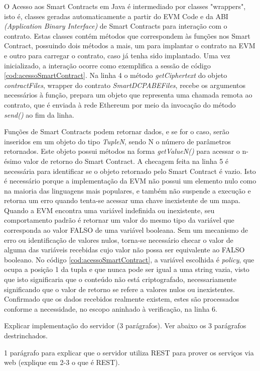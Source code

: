 \documentclass[a4paper,11pt]{article}
\begin{document}
O Acesso aos Smart Contracts em Java é intermediado por classes "wrappers", isto é, classes geradas automaticamente a partir do EVM Code e da ABI \emph{(Application Binary Interface)} de Smart Contracts para interação com o contrato.
Estas classes contém métodos que correspondem às funções nos Smart Contract, possuindo dois métodos a mais, um para implantar o contrato na EVM e outro para carregar o contrato, caso já tenha sido implantado.
Uma vez inicializado, a interação ocorre como exemplifica a sessão de código \ref{cod:acessoSmartContract}.
Na linha 4 o método \emph{getCiphertext} do objeto \emph{contractFiles}, wrapper do contrato \emph{SmartDCPABEFiles}, recebe os argumentos necessários à função, prepara um objeto que representa uma chamada remota ao contrato, que é enviada à rede Ethereum por meio da invocação do método \emph{send()} ao fim da linha.

Funções de Smart Contracts podem retornar dados, e se for o caso, serão inseridos em um objeto do tipo \emph{TupleN}, sendo N o número de parâmetros retornados. Este objeto possui métodos na forma \emph{getValueN()} para acessar o n-ésimo valor de retorno do Smart Contract.
A checagem feita na linha 5 é necessária para identificar se o objeto retornado pelo Smart Contract é vazio.
Isto é necessário porque a implementação da EVM não possui um elemento nulo como na maioria das linguagens mais populares, e também não suspende a execução e retorna um erro quando tenta-se acessar uma chave inexistente de um mapa.
Quando a EVM encontra uma variável indefinida ou inexistente, seu comportamento padrão é retornar um valor do mesmo tipo da variável que corresponda ao valor FALSO de uma variável booleana.
Sem um mecanismo de erro ou identificação de valores nulos, torna-se necessário checar o valor de alguma das variáveis recebidas cujo valor não possa ser equivalente ao FALSO booleano.
No código \ref{cod:acessoSmartContract}, a variável escolhida é \emph{policy}, que ocupa a posição 1 da tupla e que nunca pode ser igual a uma string vazia, visto que isto significaria que o conteúdo não está criptografado, necessariamente significando que o valor de retorno se refere a valores nulos ou inexistentes.
Confirmado que os dados recebidos realmente existem, estes são processados conforme a necessidade, no escopo aninhado à verificação, na linha 6.

{\color{ForestGreen} Explicar implementação do servidor (3 parágrafos). Ver abaixo os 3 parágrafos destrinchados. }

{\color{Magenta} 1 parágrafo para explicar que o servidor utiliza REST para prover os serviços via web  (explique em 2-3 o que é REST).}
\end{document}
